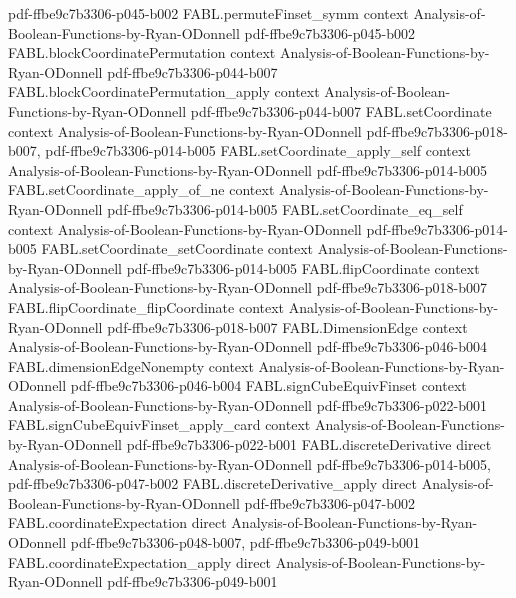 \begin{theorem}
  {pdf-ffbe9c7b3306-p045-b002}
\proofstep
  {FABL.permuteFinset_symm}
  {context}
  {Analysis-of-Boolean-Functions-by-Ryan-ODonnell}
  {pdf-ffbe9c7b3306-p045-b002}
\proofstep
  {FABL.blockCoordinatePermutation}
  {context}
  {Analysis-of-Boolean-Functions-by-Ryan-ODonnell}
  {pdf-ffbe9c7b3306-p044-b007}
\proofstep
  {FABL.blockCoordinatePermutation_apply}
  {context}
  {Analysis-of-Boolean-Functions-by-Ryan-ODonnell}
  {pdf-ffbe9c7b3306-p044-b007}
\proofstep
  {FABL.setCoordinate}
  {context}
  {Analysis-of-Boolean-Functions-by-Ryan-ODonnell}
  {pdf-ffbe9c7b3306-p018-b007,
    pdf-ffbe9c7b3306-p014-b005}
\proofstep
  {FABL.setCoordinate_apply_self}
  {context}
  {Analysis-of-Boolean-Functions-by-Ryan-ODonnell}
  {pdf-ffbe9c7b3306-p014-b005}
\proofstep
  {FABL.setCoordinate_apply_of_ne}
  {context}
  {Analysis-of-Boolean-Functions-by-Ryan-ODonnell}
  {pdf-ffbe9c7b3306-p014-b005}
\proofstep
  {FABL.setCoordinate_eq_self}
  {context}
  {Analysis-of-Boolean-Functions-by-Ryan-ODonnell}
  {pdf-ffbe9c7b3306-p014-b005}
\proofstep
  {FABL.setCoordinate_setCoordinate}
  {context}
  {Analysis-of-Boolean-Functions-by-Ryan-ODonnell}
  {pdf-ffbe9c7b3306-p014-b005}
\proofstep
  {FABL.flipCoordinate}
  {context}
  {Analysis-of-Boolean-Functions-by-Ryan-ODonnell}
  {pdf-ffbe9c7b3306-p018-b007}
\proofstep
  {FABL.flipCoordinate_flipCoordinate}
  {context}
  {Analysis-of-Boolean-Functions-by-Ryan-ODonnell}
  {pdf-ffbe9c7b3306-p018-b007}
\proofstep
  {FABL.DimensionEdge}
  {context}
  {Analysis-of-Boolean-Functions-by-Ryan-ODonnell}
  {pdf-ffbe9c7b3306-p046-b004}
\proofstep
  {FABL.dimensionEdgeNonempty}
  {context}
  {Analysis-of-Boolean-Functions-by-Ryan-ODonnell}
  {pdf-ffbe9c7b3306-p046-b004}
\proofstep
  {FABL.signCubeEquivFinset}
  {context}
  {Analysis-of-Boolean-Functions-by-Ryan-ODonnell}
  {pdf-ffbe9c7b3306-p022-b001}
\proofstep
  {FABL.signCubeEquivFinset_apply_card}
  {context}
  {Analysis-of-Boolean-Functions-by-Ryan-ODonnell}
  {pdf-ffbe9c7b3306-p022-b001}
\proofstep
  {FABL.discreteDerivative}
  {direct}
  {Analysis-of-Boolean-Functions-by-Ryan-ODonnell}
  {pdf-ffbe9c7b3306-p014-b005,
    pdf-ffbe9c7b3306-p047-b002}
\proofstep
  {FABL.discreteDerivative_apply}
  {direct}
  {Analysis-of-Boolean-Functions-by-Ryan-ODonnell}
  {pdf-ffbe9c7b3306-p047-b002}
\proofstep
  {FABL.coordinateExpectation}
  {direct}
  {Analysis-of-Boolean-Functions-by-Ryan-ODonnell}
  {pdf-ffbe9c7b3306-p048-b007,
    pdf-ffbe9c7b3306-p049-b001}
\proofstep
  {FABL.coordinateExpectation_apply}
  {direct}
  {Analysis-of-Boolean-Functions-by-Ryan-ODonnell}
  {pdf-ffbe9c7b3306-p049-b001}
\proofstep

\end{theorem}
